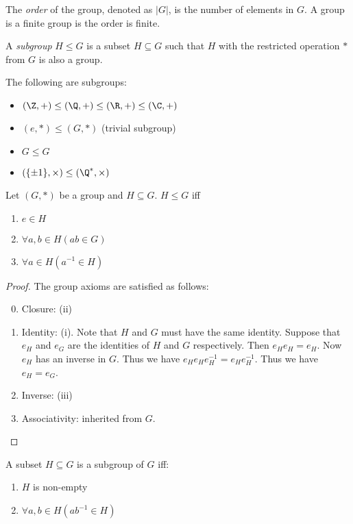 \documentclass[a4pape]{article}
\begin{document}
\begin{defi}
  The \emph{order} of the group, denoted as $|G|$, is the number of elements in $G$. A group is a finite group is the order is finite.
\end{defi}
\begin{defi}[Subgroup]
  A \emph{subgroup} $H\leq G$ is a subset $H\subseteq G$ such that $H$ with the restricted operation $*$ from $G$ is also a group.
\end{defi}
\begin{eg}
  The following are subgroups:
  \begin{itemize}
  \item $(\Z, +)\leq (\Q, +) \leq (\R, +)\leq (\C, +)$
  \item $({e}, *) \leq (G, *)$ (trivial subgroup)
  \item $G \leq G$
  \item $(\{\pm 1\}, \times) \leq (\Q^*, \times)$
  \end{itemize}
\end{eg}
\begin{lemma}
  Let $(G, *)$ be a group and $H\subseteq G$. $H \leq G$ iff
  \begin{enumerate}
  \item $e \in H$
  \item $\forall a, b\in H(ab \in G)$
  \item $\forall a \in H(a^{-1} \in H)$
  \end{enumerate}
\end{lemma}
\begin{proof}
  The group axioms are satisfied as follows:
  \begin{enumerate}[label=\arabic{*}.]
  \setcounter{enumi}{-1}
  \item Closure: (ii)
  \item Identity: (i). Note that $H$ and $G$ must have the same identity. Suppose that $e_H$ and $e_G$ are the identities of $H$ and $G$ respectively. Then $e_He_H = e_H$. Now $e_H$ has an inverse in $G$. Thus we have $e_He_He_H^{-1} = e_He_H^{-1}$. Thus we have $e_H = e_G$.
  \item Inverse: (iii)
  \item Associativity: inherited from $G$.
  \end{enumerate}
\end{proof}
\begin{lemma}
  A subset $H\subseteq G$ is a subgroup of $G$ iff:
  \begin{enumerate}[label=(\Roman{*})]
  \item $H$ is non-empty
  \item $\forall a, b\in H(ab^{-1}\in H)$
  \end{enumerate}
\end{lemma}
\end{document}
